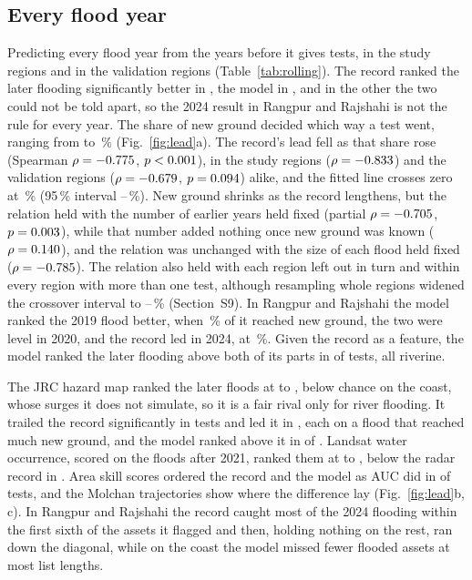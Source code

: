 \documentclass[10pt,a4paper,twocolumn]{article}
\begin{document}
\subsection{Every flood year}
\label{sec:rollresult}

Predicting every flood year from the years before it gives \PoolTests{} tests, \PoolStudyTests{} in the study regions and \PoolValidationTests{} in the validation regions (Table~\ref{tab:rolling}). The record ranked the later flooding significantly better in \PoolRecordWins{}, the model in \PoolModelWins{}, and in the other \PoolTies{} the two could not be told apart, so the 2024 result in Rangpur and Rajshahi is not the rule for every year. The share of new ground decided which way a test went, ranging from \PoolNewGroundMin{} to \PoolNewGroundMax{}\,\% (Fig.~\ref{fig:lead}a). The record's lead fell as that share rose (Spearman $\rho=-0.775{}$, $p<0.001{}$), in the study regions ($\rho=-0.833{}$) and the validation regions ($\rho=-0.679{}$, $p=0.094{}$) alike, and the fitted line crosses zero at \PoolCrossing{}\,\% (95\,\% interval \PoolCrossingLow{}--\PoolCrossingHigh{}\,\%). New ground shrinks as the record lengthens, but the relation held with the number of earlier years held fixed (partial $\rho=-0.705{}$, $p=0.003{}$), while that number added nothing once new ground was known ($\rho=0.140{}$), and the relation was unchanged with the size of each flood held fixed ($\rho=-0.785{}$). The relation also held with each region left out in turn and within every region with more than one test, although resampling whole regions widened the crossover interval to \RegionBootCrossingLow{}--\RegionBootCrossingHigh{}\,\% (Section~S9). In Rangpur and Rajshahi the model ranked the 2019 flood better, when \RRRollNineteenNewGround{}\,\% of it reached new ground, the two were level in 2020, and the record led in 2024, at \RRRollTwentyFourNewGround{}\,\%. Given the record as a feature, the model ranked the later flooding above both of its parts in \CombinedAheadBoth{} of \CombinedTests{} tests, all riverine.

The JRC hazard map ranked the later floods at \MapAUCMin{} to \MapAUCMax{}, below chance on the coast, whose surges it does not simulate, so it is a fair rival only for river flooding. It trailed the record significantly in \MapRecordAheadSig{} tests and led it in \MapAheadSig{}, each on a flood that reached much new ground, and the model ranked above it in \MapModelAhead{} of \MapTests{}. Landsat water occurrence, scored on the \OccTests{} floods after 2021, ranked them at \OccAUCMin{} to \OccAUCMax{}, below the radar record in \OccBelowRecord{}. Area skill scores ordered the record and the model as AUC did in \AssAgree{} of \AssTests{} tests, and the Molchan trajectories show where the difference lay (Fig.~\ref{fig:lead}b, c). In Rangpur and Rajshahi the record caught most of the 2024 flooding within the first sixth of the assets it flagged and then, holding nothing on the rest, ran down the diagonal, while on the coast the model missed fewer flooded assets at most list lengths.
\end{document}
